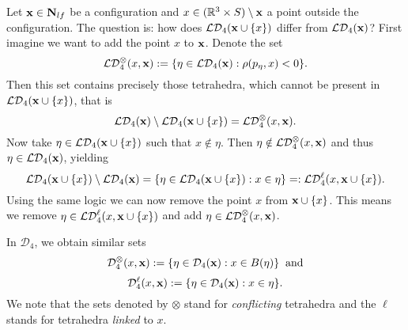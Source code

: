 


\begin{remark}\label{r:addremove}
	Let ${\mathbf{x}}\in \mathbf N_{lf}$ be a configuration and $x\in({\mathbb R^3} \times S) \setminus {\mathbf{x}}$ a point outside the configuration. The question is: how does $\mathcal {LD}_4({\mathbf{x}} \cup \{x\})$ differ from $\mathcal {LD}_4({\mathbf{x}})$?
	First imagine we want to add the point $x$ to ${\mathbf{x}}$. Denote the set 
	$$\mathcal {LD}_4^\otimes(x,{\mathbf{x}}) := \{\eta \in \mathcal {LD}_4({\mathbf{x}}): \rho(p_\eta,x) < 0\}.$$
	Then this set contains precisely those tetrahedra, which cannot be present in $\mathcal {LD}_4({\mathbf{x}} \cup \{x\})$, that is
	$$ \mathcal {LD}_4 ({\mathbf{x}}) \setminus \mathcal {LD}_4({\mathbf{x}} \cup \{x\}) = \mathcal {LD}_4^\otimes(x,{\mathbf{x}}).$$
	Now take $\eta \in \mathcal {LD}_4({\mathbf{x}} \cup \{x\})$ such that $x \notin \eta$. Then $\eta \notin \mathcal {LD}_4^\otimes(x,{\mathbf{x}})$ and thus $\eta \in \mathcal {LD}_4({\mathbf{x}})$, yielding
	$$\mathcal {LD}_4 ({\mathbf{x}} \cup \{x\}) \setminus \mathcal {LD}_4({\mathbf{x}}) = \{ \eta \in \mathcal {LD}_4({\mathbf{x}}\cup\{x\}): x \in \eta\} =: \mathcal {LD}_4^\ell(x, {\mathbf{x}} \cup \{x\}).$$
	Using the same logic we can now remove the point $x$ from ${\mathbf{x}} \cup \{x\}$. This means we remove $\eta \in \mathcal {LD}_4^\ell(x,{\mathbf{x}}\cup\{x\})$ and add $\eta \in \mathcal {LD}_4^\otimes(x,{\mathbf{x}})$.\newline

	\noindent In $\mathcal D_4$, we obtain similar sets
	$$\mathcal D_4^\otimes(x,{\mathbf{x}}) := \{\eta \in \mathcal D_4({\mathbf{x}}): x \in B(\eta)\} \;\; \text{and}$$
	$$\mathcal D_4^\ell(x,{\mathbf{x}}) := \{\eta \in \mathcal D_4({\mathbf{x}}): x\in \eta \}.$$
	We note that the sets denoted by $\otimes$ stand for \textit{conflicting} tetrahedra and the $\ell$ stands for tetrahedra \textit{linked} to $x$. 

\end{remark}
